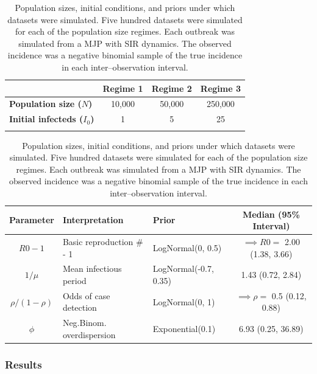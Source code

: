 \begin{table}[htbp]
	\caption[LNA coverage simulation settings.]{Population sizes, initial conditions, and priors under which datasets were simulated. Five hundred datasets were simulated for each of the population size regimes. Each outbreak was simulated from a MJP with SIR dynamics. The observed incidence was a negative binomial sample of the true incidence in each inter--observation interval.}
	\label{tab:lna_coverage_sim}
	\footnotesize
	\centering
	\begin{tabular}{lccc}
		\hline
		& \textbf{Regime 1} & \textbf{Regime 2} & \textbf{Regime 3} \\\hline
		\textbf{Population size ($ N $)} & 10,000 & 50,000 & 250,000 \\ 
		\textbf{Initial infecteds ($ I_0 $)} & 1 & 5 & 25 \\
		\hline
		&&&
	\end{tabular} 

	\begin{tabular}{cllc}
		\hline
		\textbf{Parameter} & \textbf{Interpretation} & \textbf{Prior} & \textbf{Median (95\% Interval)} \\ \hline
		$ R0-1 $ & Basic reproduction \# - 1 & LogNormal(0, 0.5) & $ \implies R0 = $ 2.00 (1.38, 3.66) \\ 
		$ 1/\mu $ & Mean infectious period & LogNormal(-0.7, 0.35)& 1.43 (0.72, 2.84) \\
		$ \rho / (1-\rho) $ & Odds of case detection & LogNormal(0, 1) & $ \implies \rho =$ 0.5 (0.12, 0.88) \\
		$ \phi $ & Neg.Binom. overdispersion & Exponential(0.1) & 6.93 (0.25, 36.89)\\
		\hline
	\end{tabular}
\end{table}

\subsubsection{Results}

